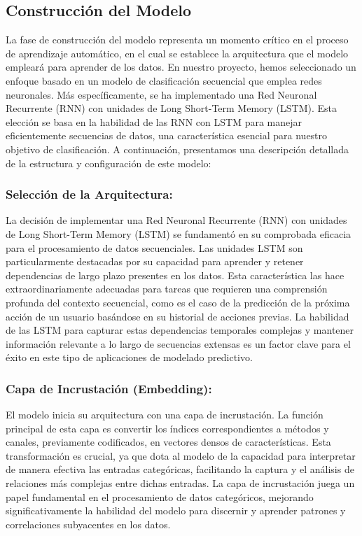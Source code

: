 \subsection{Construcción del Modelo}
La fase de construcción del modelo representa un momento crítico en el proceso de aprendizaje automático, en el cual se establece la arquitectura que el modelo empleará para aprender de los datos. En nuestro proyecto, hemos seleccionado un enfoque basado en un modelo de clasificación secuencial que emplea redes neuronales. Más específicamente, se ha implementado una Red Neuronal Recurrente (RNN) con unidades de Long Short-Term Memory (LSTM). Esta elección se basa en la habilidad de las RNN con LSTM para manejar eficientemente secuencias de datos, una característica esencial para nuestro objetivo de clasificación. A continuación, presentamos una descripción detallada de la estructura y configuración de este modelo:

\subsubsection{Selección de la Arquitectura:} 
La decisión de implementar una Red Neuronal Recurrente (RNN) con unidades de Long Short-Term Memory (LSTM) se fundamentó en su comprobada eficacia para el procesamiento de datos secuenciales. Las unidades LSTM son particularmente destacadas por su capacidad para aprender y retener dependencias de largo plazo presentes en los datos. Esta característica las hace extraordinariamente adecuadas para tareas que requieren una comprensión profunda del contexto secuencial, como es el caso de la predicción de la próxima acción de un usuario basándose en su historial de acciones previas. La habilidad de las LSTM para capturar estas dependencias temporales complejas y mantener información relevante a lo largo de secuencias extensas es un factor clave para el éxito en este tipo de aplicaciones de modelado predictivo.

\subsubsection{Capa de Incrustación (Embedding):} 
El modelo inicia su arquitectura con una capa de incrustación. La función principal de esta capa es convertir los índices correspondientes a métodos y canales, previamente codificados, en vectores densos de características. Esta transformación es crucial, ya que dota al modelo de la capacidad para interpretar de manera efectiva las entradas categóricas, facilitando la captura y el análisis de relaciones más complejas entre dichas entradas. La capa de incrustación juega un papel fundamental en el procesamiento de datos categóricos, mejorando significativamente la habilidad del modelo para discernir y aprender patrones y correlaciones subyacentes en los datos.

